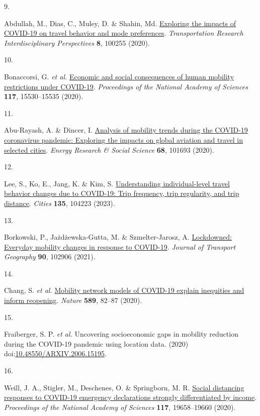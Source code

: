 \documentclass[
  11pt,
]{article}
\newlength{\cslhangindent}
\newlength{\csllabelwidth}
\newenvironment{CSLReferences}[2] %
 {\begin{list}{}{%
  \setlength{\itemindent}{0pt}
  \setlength{\leftmargin}{0pt}
  \setlength{\parsep}{0pt}
  \ifodd #1
   \setlength{\leftmargin}{\cslhangindent}
   \setlength{\itemindent}{-1\cslhangindent}
  \fi
  \setlength{\itemsep}{#2\baselineskip}}}
 {\end{list}}
\newcommand{\CSLLeftMargin}[1]{\parbox[t]{\csllabelwidth}{\strut#1\strut}}
\newcommand{\CSLRightInline}[1]{\parbox[t]{\linewidth - \csllabelwidth}{\strut#1\strut}}
\begin{document}
\begin{CSLReferences}{0}{0}
\CSLLeftMargin{9. }%
\CSLRightInline{Abdullah, M., Dias, C., Muley, D. \& Shahin, Md.
\href{https://doi.org/10.1016/j.trip.2020.100255}{Exploring the impacts
of COVID-19 on travel behavior and mode preferences}.
\emph{Transportation Research Interdisciplinary Perspectives}
\textbf{8}, 100255 (2020).}

\CSLLeftMargin{10. }%
\CSLRightInline{Bonaccorsi, G. \emph{et al.}
\href{https://doi.org/10.1073/pnas.2007658117}{Economic and social
consequences of human mobility restrictions under COVID-19}.
\emph{Proceedings of the National Academy of Sciences} \textbf{117},
15530--15535 (2020).}

\CSLLeftMargin{11. }%
\CSLRightInline{Abu-Rayash, A. \& Dincer, I.
\href{https://doi.org/10.1016/j.erss.2020.101693}{Analysis of mobility
trends during the COVID-19 coronavirus pandemic: Exploring the impacts
on global aviation and travel in selected cities}. \emph{Energy Research
\& Social Science} \textbf{68}, 101693 (2020).}

\CSLLeftMargin{12. }%
\CSLRightInline{Lee, S., Ko, E., Jang, K. \& Kim, S.
\href{https://doi.org/10.1016/j.cities.2023.104223}{Understanding
individual-level travel behavior changes due to COVID-19: Trip
frequency, trip regularity, and trip distance}. \emph{Cities}
\textbf{135}, 104223 (2023).}

\CSLLeftMargin{13. }%
\CSLRightInline{Borkowski, P., Jażdżewska-Gutta, M. \& Szmelter-Jarosz,
A. \href{https://doi.org/10.1016/j.jtrangeo.2020.102906}{Lockdowned:
Everyday mobility changes in response to COVID-19}. \emph{Journal of
Transport Geography} \textbf{90}, 102906 (2021).}

\CSLLeftMargin{14. }%
\CSLRightInline{Chang, S. \emph{et al.}
\href{https://doi.org/10.1038/s41586-020-2923-3}{Mobility network models
of COVID-19 explain inequities and inform reopening}. \emph{Nature}
\textbf{589}, 82--87 (2020).}

\CSLLeftMargin{15. }%
\CSLRightInline{Fraiberger, S. P. \emph{et al.} Uncovering socioeconomic
gaps in mobility reduction during the COVID-19 pandemic using location
data. (2020)
doi:\href{https://doi.org/10.48550/ARXIV.2006.15195}{10.48550/ARXIV.2006.15195}.}

\CSLLeftMargin{16. }%
\CSLRightInline{Weill, J. A., Stigler, M., Deschenes, O. \& Springborn,
M. R. \href{https://doi.org/10.1073/pnas.2009412117}{Social distancing
responses to COVID-19 emergency declarations strongly differentiated by
income}. \emph{Proceedings of the National Academy of Sciences}
\textbf{117}, 19658--19660 (2020).}


\end{CSLReferences}
\end{document}
